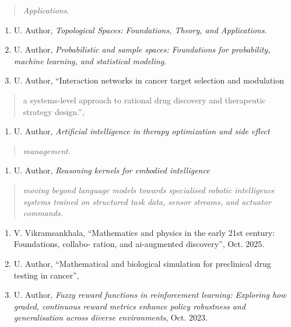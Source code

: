 \documentclass[
]{article}
\begin{document}
\begin{quote}
\emph{Applications}.
\end{quote}

\begin{enumerate}
\def\labelenumi{\arabic{enumi}.}
\setcounter{enumi}{14}
\item
  \protect{}\label{_bookmark55}{}U. Author,
  \emph{Topological Spaces: Foundations, Theory, and Applications}.
\item
  \protect{}\label{_bookmark56}{}U. Author,
  \emph{Probabilistic and sample spaces: Foundations for probability,
  machine learning, and statistical modeling}.
\item
  \protect{}\label{_bookmark57}{}U. Author, ``Interaction
  networks in cancer target selection and modulation
\end{enumerate}

\begin{quote}
a systems-level approach to rational drug discovery and therapeutic
strategy design.'',
\end{quote}

\begin{enumerate}
\def\labelenumi{\arabic{enumi}.}
\setcounter{enumi}{17}
\item
  \protect{}\label{_bookmark58}{}U. Author,
  \emph{Artificial intelligence in therapy optimization and side eflect}
\end{enumerate}

\begin{quote}
\emph{management}.
\end{quote}

\begin{enumerate}
\def\labelenumi{\arabic{enumi}.}
\setcounter{enumi}{18}
\item
  \protect{}\label{_bookmark59}{}U. Author, \emph{Reasoning
  kernels for embodied intelligence}
\end{enumerate}

\begin{quote}
\emph{moving beyond language models towards specialised robotic
intelligence systems trained on structured task data, sensor streams,
and actuator commands.}
\end{quote}

\begin{enumerate}
\def\labelenumi{\arabic{enumi}.}
\setcounter{enumi}{19}
\item
  \protect{}\label{_bookmark60}{}V. Vikramsankhala,
  ``Mathematics and physics in the early 21st century: Foundations,
  collabo- ration, and ai-augmented discovery'', Oct. 2025.
\item
  \protect{}\label{_bookmark61}{}U. Author, ``Mathematical
  and biological simulation for preclinical drug testing in cancer'',
\item
  \protect{}\label{_bookmark62}{}U. Author, \emph{Fuzzy
  reward functions in reinforcement learning: Exploring how graded,
  continuous reward metrics enhance policy robustness and generalisation
  across diverse environments}, Oct. 2023.
\end{enumerate}
\end{document}
